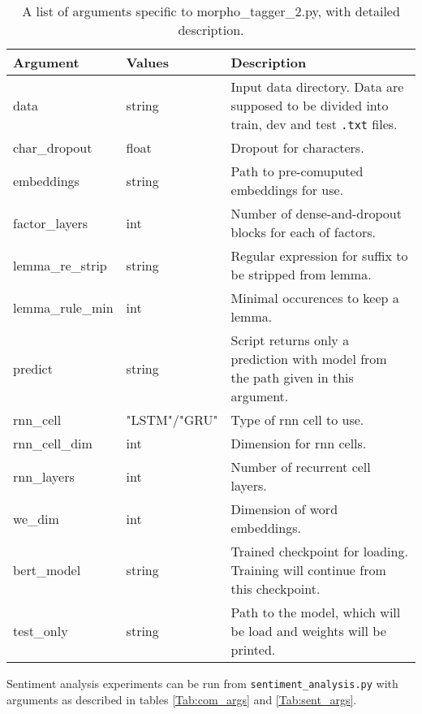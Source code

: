 \begin{table}
\centering
\begin{tabular}{ |p{3cm}|p{}|p{6cm}| } 
 \hline
 Argument & Values & Description \\ 
 \hline \hline
 data & string &  Input data directory. Data are supposed to be divided into train, dev and test \texttt{.txt} files. \\ \hline
 char\_dropout &  float &  Dropout for characters. \\ \hline
embeddings & string & Path to pre-comuputed embeddings for use. \\ \hline
factor\_layers & int & Number of dense-and-dropout blocks for each of factors.  \\ \hline
lemma\_re\_strip &  string & Regular expression for suffix to be stripped from lemma. \\ \hline
lemma\_rule\_min & int & Minimal occurences to keep a lemma.  \\ \hline
predict & string & Script returns only a prediction with model from the path given in this argument.  \\ \hline
rnn\_cell & "LSTM"/"GRU" & Type of rnn cell to use. \\ \hline
rnn\_cell\_dim & int & Dimension for rnn cells.  \\ \hline
rnn\_layers& int & Number of recurrent cell layers.  \\ \hline
we\_dim & int & Dimension of word embeddings.  \\ \hline  


bert\_model & string & Trained checkpoint for loading. Training will continue from this checkpoint. \\ \hline

test\_only & string & Path to the model, which will be load and weights will be printed.  \\ \hline
 \hline
\end{tabular}
\caption{A list of arguments specific to morpho\_tagger\_2.py, with detailed description.} 
\label{Tab:mt2_args}
\end{table}

Sentiment analysis experiments can be run from \texttt{sentiment\_analysis.py} with arguments as described in tables \ref{Tab:com_args} and \ref{Tab:sent_args}.

